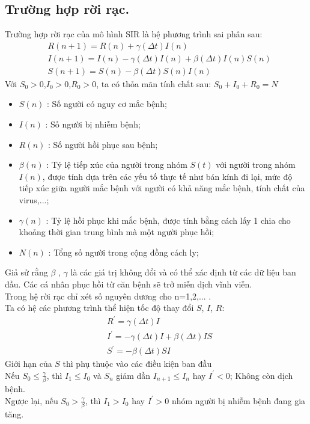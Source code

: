 \documentclass[a4paper]{article}
\begin{document}
\subsection{Trường hợp rời rạc.} 
Trường hợp rời rạc của mô hình SIR là hệ phương trình sai phân sau:
	\begin{align} 
   	 &R(n+1) 	= R(n) + \gamma (\Delta t) I(n)  \label{f1}\\
	&I(n+1) 	= I(n) - \gamma (\Delta t) I(n) + \beta (\Delta t) I(n)S(n) \label{f2}   \\
	&S(n+1) 	= S(n) - \beta (\Delta t) S(n)I(n)  \label{f3}
	\end{align}
	Với $ S_{0}>0 $,$ I_{0}>0 $,$ R_{0}>0 $, ta có thỏa mãn tính chất sau: 
	$ S_{0} + I_{0} + R_{0} = N $ \\
		\begin{itemize}
	\item $S(n)$ : Số người có nguy cơ mắc bệnh;
	\item $I(n)$ : Số người bị nhiễm bệnh;
	\item $R(n)$ : Số người hồi phục sau bệnh;
	\item $\beta(n)$ : Tỷ lệ tiếp xúc của người trong nhóm $S(t)$ với người trong nhóm $I(n)$, được tính dựa trên các yếu tố thực tế như bán kính đi lại, mức độ tiếp xúc giữa người mắc bệnh với người có khả năng mắc bệnh, tính chất của virus,...;
	\item $\gamma(n)$ : Tỷ lệ hồi phục khi mắc bệnh, được tính bằng cách lấy 1 chia cho khoảng thời gian trung bình mà một người phục hồi;
	\item $N(n)$ : Tổng số người trong cộng đồng cách ly;
	\end{itemize}
	Giả sử rằng $\beta$ , $\gamma$ là các giá trị không đổi và có thể xác định từ các dữ liệu ban đầu. Các cá nhân phục hồi từ căn bệnh sẽ trở miễn dịch vĩnh viễn.\\
	Trong hệ rời rạc chỉ xét số nguyên dương cho n=1,2,... .\\
	
	
	Ta có hệ các phương trình thể hiện tốc độ thay đổi $ S$,   $I $, $ R$:
	\begin{align} 
    &R^{'} 	= \gamma (\Delta t) I  \\
	&I^{'} 	= - \gamma (\Delta t) I + \beta (\Delta t) IS   \\
	&S^{'} 	= - \beta (\Delta t) SI  \label{eq3}
	\end{align}
    Giới hạn của $S$ thì phụ thuộc vào các điều kiện ban đầu\\ Nếu $S_{0} \leq \frac{\gamma}{\beta} $, thì $I_{1} \leq I_{0}$ và $S_{n}$ giảm dần $I_{n+1} \leq I_{n}$ hay $I^{'}<0$; Không còn dịch bệnh.\\
	Ngược lại, nếu $S_{0} > \frac{\gamma}{\beta} $, thì $I_{1} > I_{0}$ hay $I^{'}>0$ nhóm người bị nhiễm bệnh đang gia tăng.\\
\end{document}
